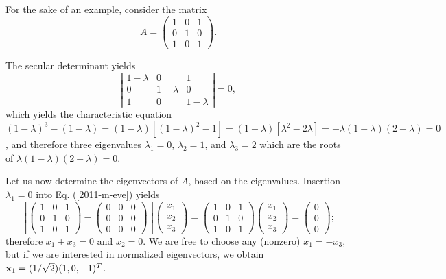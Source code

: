 {\color{blue}
\bexample
For the sake of an example, consider  the
{matrix}
\begin{equation}
A=
\begin{pmatrix}
1&0&1\\
0&1&0\\
1&0&1
\end{pmatrix}.
\end{equation}

The secular determinant yields
$$
\left|
\begin{matrix}
1-\lambda &0&1\\
0&1-\lambda &0\\
1&0&1-\lambda
\end{matrix}
\right| = 0,
$$
which yields the characteristic equation
$
(1-\lambda )^3 -(1-\lambda ) =(1-\lambda )[(1-\lambda )^2 - 1]=(1-\lambda )[\lambda ^2 - 2\lambda ]= - \lambda (1-\lambda )(2-\lambda ) =0$,
and therefore three  eigenvalues
$\lambda_1=0$,
$\lambda_2=1$, and
$\lambda_3=2$ which are the roots of $\lambda (1-\lambda )(2-\lambda ) =0$.

Let us now determine the eigenvectors of $A$, based on the eigenvalues.
Insertion  $\lambda_1=0$ into Eq. (\ref{2011-m-eve}) yields
\begin{equation}
\left[
\begin{pmatrix}
1&0&1\\
0&1&0\\
1&0&1
\end{pmatrix}  -
\begin{pmatrix}
0&0&0\\
0&0&0\\
0&0&0
\end{pmatrix}
\right]
\begin{pmatrix}
x_1\\
x_2\\
x_3
\end{pmatrix}
=
\begin{pmatrix}
1&0&1\\
0&1&0\\
1&0&1
\end{pmatrix}
\begin{pmatrix}
x_1\\
x_2\\
x_3
\end{pmatrix}
=
\begin{pmatrix}
0\\
0\\
0
\end{pmatrix}
;
\end{equation}
therefore $x_1+x_3=0$ and $x_2=0$.
We are free to choose any (nonzero) $x_1=-x_3$,
but if we are interested in normalized eigenvectors, we obtain
${\bf x}_1 =(1/\sqrt{2})(1,0,-1)^T$.

}
